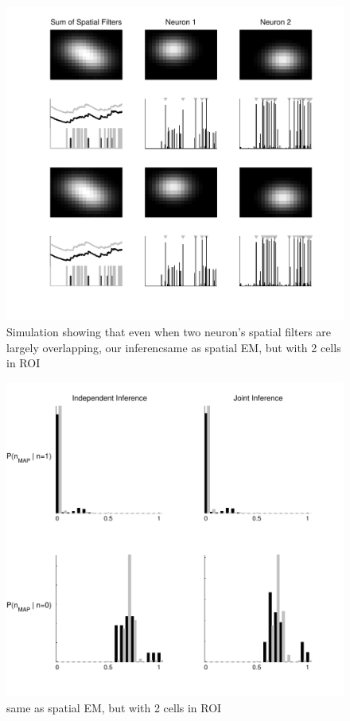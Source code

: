 \begin{figure}[H]
\centering \includegraphics[width=.9\linewidth]{../figs/spatial_multi2}
\caption{Simulation showing that even when two neuron's spatial filters are largely overlapping, our inferencsame as spatial EM, but with 2 cells in ROI} \label{fig:spatial_multi}
\end{figure}

\begin{figure}[H]
\centering \includegraphics[width=.9\linewidth]{../figs/multi_hist1}
\caption{same as spatial EM, but with 2 cells in ROI} \label{fig:spatial_multi}
\end{figure}

